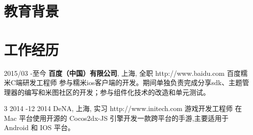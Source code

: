 \documentclass[10pt]{article} %
\begin{document}

\section{教育背景}





\section{工作经历}

\job
{2015/03 -}{至今}
{\textbf{百度（中国）有限公司}, 上海, 全职}
{http://www.baidu.com} 
{百度糯米C端研发工程师}
{参与糯米ios客户端的开发。期间单独负责完成分享sdk、主题管理器的编写和米图社区的开发；参与组件化技术的改造和单元测试。}


\job
{3 2014 -}{12 2014}
{DeNA, 上海, 实习}
{http://www.initech.com}
{游戏开发工程师}
{ 在 Mac 平台使用开源的 Cocos2dx-JS 引擎开发一款跨平台的手游,主要适用于 Android 和 IOS 平台。}

%
\end{document}
